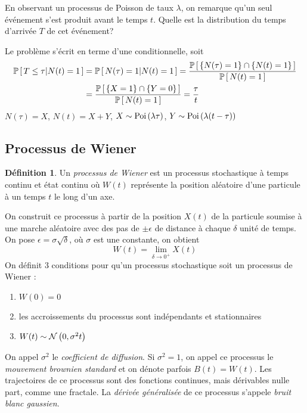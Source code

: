 \documentclass[11pt]{article}
\makeatletter
\renewcommand\P[1]{%
	\ensuremath{%
		\mathbb{P}\left[\,#1\,\right]%
	}%
}%
\newcommand\Pg[2]{%
	\ensuremath{%
		\mathbb{P}\left[\,#1\middle\rvert#2\,\right]%
	}%
}%
\newcommand\Poi[1]{%
	\ensuremath{%
		\mathrm{Poi}\left(#1\right)%
	}%
}%
\newcommand\Norm[2]{%
	\ensuremath{%
		\mathcal{N}\left(#1,#2\right)%
	}%
}%
\theoremstyle{remark}
\theoremstyle{definition}
\newtheorem*{@definition}{Définition}
\newenvironment{definition}{%
	\begin{@definition}%
}{%
	\end{@definition}%
	\setcounter{property}{0}%
}
\makeatother
\begin{document}
\begin{exemple}
	En observant un processus de Poisson de taux $\lambda$, on remarque qu'un
	seul événement s'est produit avant le temps $t$. Quelle est la distribution
	du temps d'arrivée $T$ de cet événement?

	Le problème s'écrit en terme d'une conditionnelle, soit
	\begin{equation*}
		\begin{split}
		\Pg{T\leq\tau}{N(t)=1}
		&=\Pg{N(\tau)=1}{N(t)=1}
		=\frac{\P{\left\{N(\tau)=1\right\}\cap\left\{N(t)=1\right\}}}
			{\P{N(t)=1}}\\
		&=\frac{\P{\left\{X=1\right\}\cap\left\{Y=0\right\}}}
			{\P{N(t)=1}}
		=\frac{\tau}{t}
		\end{split}
	\end{equation*}
	$N(\tau)=X$, $N(t)=X+Y$, $X\sim\Poi{\lambda\tau}$, $Y\sim\Poi{\lambda(t-\tau)}$
\end{exemple}

\subsection{Processus de Wiener}
\begin{definition}
	Un \textit{processus de Wiener} est un processus stochastique à temps
	continu et état continu où $W(t)$ représente la position aléatoire d'une
	particule à un temps $t$ le long d'un axe.
\end{definition}

On construit ce processus à partir de la position $X(t)$ de la particule
soumise à une marche aléatoire avec des pas de $\pm\epsilon$ de distance à
chaque $\delta$ unité de temps. On pose $\epsilon=\sigma\sqrt{\delta}$, où 
$\sigma$ est une constante, on obtient
\begin{equation*}
	W(t)=\lim_{\delta\rightarrow 0^+}X(t)
\end{equation*}
On définit 3 conditions pour qu'un processus stochastique soit un processus
de Wiener :
\begin{enumerate}
	\item $W(0)=0$
	\item les accroissements du processus sont indépendants et stationnaires
	\item $W(t)\sim\Norm{0}{\sigma^2 t}$
\end{enumerate}

On appel $\sigma^2$ le \textit{coefficient de diffusion}. Si $\sigma^2=1$, on
appel ce processus le \textit{mouvement brownien standard} et on dénote parfois
$B(t)=W(t)$. Les trajectoires de ce processus sont des fonctions continues,
mais dérivables nulle part, comme une fractale. La \textit{dérivée généralisée}
de ce processus s'appele \textit{bruit blanc gaussien}.
\end{document}
